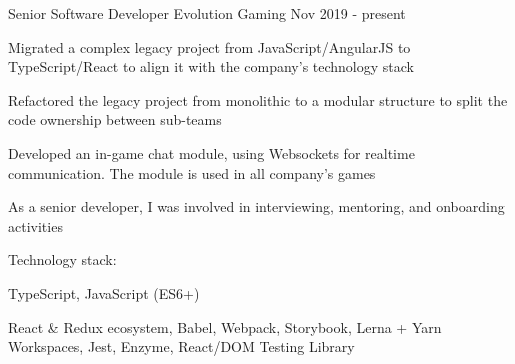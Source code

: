 

\begin{cventries}


  \cventry
    {Senior Software Developer} %
    {Evolution Gaming} %
    {} %
    {Nov 2019 - present} %
    {
      \begin{cvitems}
        \item Migrated a complex legacy project from JavaScript/AngularJS to TypeScript/React to align it with the company's technology stack
        \item Refactored the legacy project from monolithic to a modular structure to split the code ownership between sub-teams
        \item Developed an in-game chat module, using Websockets for realtime communication. The module is used in all company's games
        \item As a senior developer, I was involved in interviewing, mentoring, and onboarding activities
      \end{cvitems}
      \vspace{5mm}
      Technology stack:
      \begin{cvstackitems}
        \item TypeScript, JavaScript (ES6+)
        \item React \& Redux ecosystem, Babel, Webpack, Storybook, Lerna + Yarn Workspaces, Jest, Enzyme, React/DOM Testing Library
      \end{cvstackitems}
      \vspace{-4.0mm}
    }


\end{cventries}
